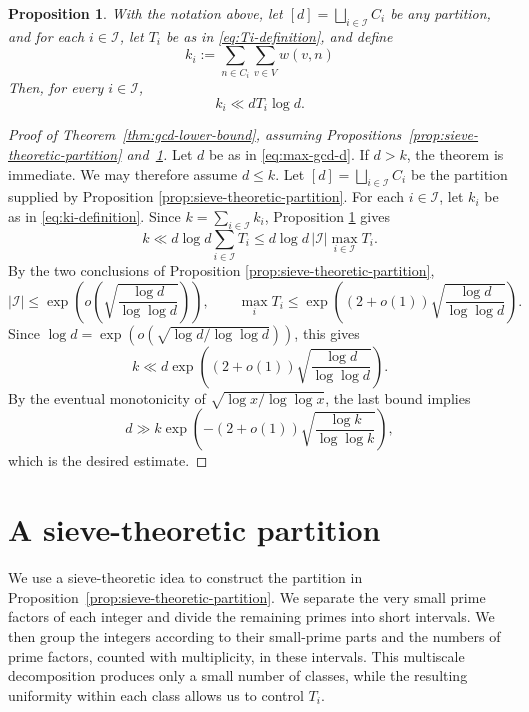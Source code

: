 \documentclass[11pt]{amsart}
\newtheorem{prop}[thm]{Proposition}
\theoremstyle{remark}
\begin{document}
\begin{prop}\label{prop:weighted-partition-bound}
  With the notation above, let
  $[d]=\bigsqcup_{i\in\mathcal I}C_i$ be any partition, and for each
  $i\in\mathcal I$, let $T_i$ be as in \eqref{eq:Ti-definition}, and define
  \begin{equation}\label{eq:ki-definition}
    k_i:=\sum_{n\in C_i}\sum_{v\in V}w(v,n)
  \end{equation}
  Then, for every $i\in\mathcal I$,
  \[
    k_i\ll dT_i\log d.
  \]
\end{prop}

\begin{proof}[Proof of Theorem~\ref{thm:gcd-lower-bound}, assuming
  Propositions~\ref{prop:sieve-theoretic-partition}
  and~\ref{prop:weighted-partition-bound}]
  Let $d$ be as in \eqref{eq:max-gcd-d}. If $d>k$, the theorem is immediate. We may therefore assume $d\leq k$.
  Let $[d]=\bigsqcup_{i\in\mathcal I}C_i$ be the partition supplied by Proposition \ref{prop:sieve-theoretic-partition}. For each $i\in\mathcal I$, let $k_i$ be as in \eqref{eq:ki-definition}. Since $k=\sum_{i\in\mathcal I}k_i$, Proposition \ref{prop:weighted-partition-bound} gives
  \[
    k
    \ll d\log d \sum_{i\in\mathcal I}T_i
    \leq d\log d\,|\mathcal I|\max_{i\in\mathcal I}T_i.
  \]
  By the two conclusions of Proposition \ref{prop:sieve-theoretic-partition},
  \[
    |\mathcal I|\leq \exp\!\left(o\!\left(\sqrt{\frac{\log d}{\log\log d}}\right)\right),
    \qquad
    \max_i T_i\leq \exp\!\left((2+o(1))\sqrt{\frac{\log d}{\log\log d}}\right).
  \]
  Since $\log d=\exp(o(\sqrt{\log d/\log\log d}))$, this gives
  \[
    k\ll d\exp\!\left((2+o(1))\sqrt{\frac{\log d}{\log\log d}}\right).
  \]
  By the eventual monotonicity of $\sqrt{\log x/\log\log x}$, the last bound implies
  \[
    d\gg k\exp\!\left(-(2+o(1))\sqrt{\frac{\log k}{\log\log k}}\right),
  \]
  which is the desired estimate.
\end{proof}

\section{A sieve-theoretic partition}
\label{sec:sieve-theory}

We use a sieve-theoretic idea to construct the partition in
Proposition~\ref{prop:sieve-theoretic-partition}. We separate the very small
prime factors of each integer and divide the remaining primes into short
intervals. We then group the integers according to their small-prime parts and
the numbers of prime factors, counted with multiplicity, in these intervals.
This multiscale decomposition produces only a small number of classes, while
the resulting uniformity within each class allows us to control $T_i$.
\end{document}
